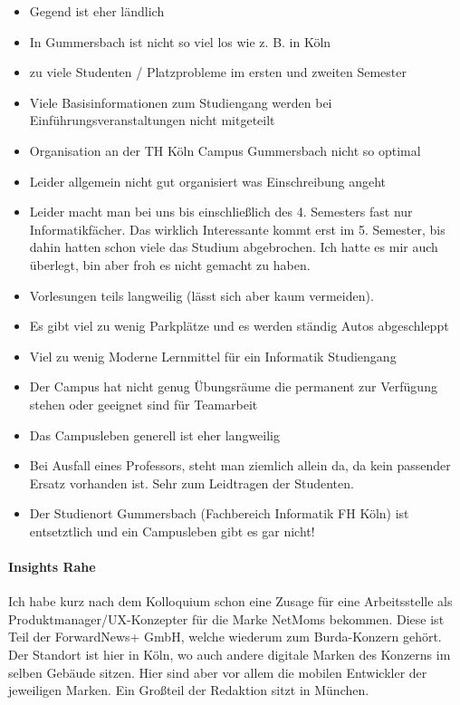 \begin{itemize}
\tightlist
\item
  Gegend ist eher ländlich
\item
  In Gummersbach ist nicht so viel los wie z. B. in Köln
\item
  zu viele Studenten / Platzprobleme im ersten und zweiten Semester
\item
  Viele Basisinformationen zum Studiengang werden bei
  Einführungsveranstaltungen nicht mitgeteilt
\item
  Organisation an der TH Köln Campus Gummersbach nicht so optimal
\item
  Leider allgemein nicht gut organisiert was Einschreibung angeht
\item
  Leider macht man bei uns bis einschließlich des 4. Semesters fast nur
  Informatikfächer. Das wirklich Interessante kommt erst im 5. Semester,
  bis dahin hatten schon viele das Studium abgebrochen. Ich hatte es mir
  auch überlegt, bin aber froh es nicht gemacht zu haben.
\item
  Vorlesungen teils langweilig (lässt sich aber kaum vermeiden).
\item
  Es gibt viel zu wenig Parkplätze und es werden ständig Autos
  abgeschleppt
\item
  Viel zu wenig Moderne Lernmittel für ein Informatik Studiengang
\item
  Der Campus hat nicht genug Übungsräume die permanent zur Verfügung
  stehen oder geeignet sind für Teamarbeit
\item
  Das Campusleben generell ist eher langweilig
\item
  Bei Ausfall eines Professors, steht man ziemlich allein da, da kein
  passender Ersatz vorhanden ist. Sehr zum Leidtragen der Studenten.
\item
  Der Studienort Gummersbach (Fachbereich Informatik FH Köln) ist
  entsetztlich und ein Campusleben gibt es gar nicht!
\end{itemize}

\paragraph{Insights Rahe}\label{insights-rahe}

Ich habe kurz nach dem Kolloquium schon eine Zusage für eine
Arbeitsstelle als Produktmanager/UX-Konzepter für die Marke NetMoms
bekommen. Diese ist Teil der ForwardNews+ GmbH, welche wiederum zum
Burda-Konzern gehört. Der Standort ist hier in Köln, wo auch andere
digitale Marken des Konzerns im selben Gebäude sitzen. Hier sind aber
vor allem die mobilen Entwickler der jeweiligen Marken. Ein Großteil der
Redaktion sitzt in München.

